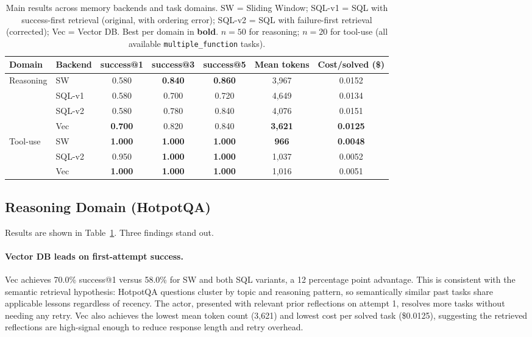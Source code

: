 \documentclass{article}
\begin{document}
\begin{table}[t]
\centering
\caption{
  Main results across memory backends and task domains.
  SW = Sliding Window; SQL-v1 = SQL with success-first retrieval (original,
  with ordering error); SQL-v2 = SQL with failure-first retrieval
  (corrected); Vec = Vector DB. Best per domain in \textbf{bold}.
  $n{=}50$ for reasoning; $n{=}20$ for tool-use (all available
  \texttt{multiple\_function} tasks).
}
\label{tab:main}
\small
\begin{tabular}{llccccc}
\toprule
Domain & Backend & success@1 & success@3 & success@5
  & Mean tokens & Cost/solved (\$) \\
\midrule
\multirow{4}{*}{Reasoning}
  & SW       & 0.580 & \textbf{0.840} & \textbf{0.860}
             & 3{,}967 & 0.0152 \\
  & SQL-v1   & 0.580 & 0.700          & 0.720
             & 4{,}649 & 0.0134 \\
  & SQL-v2   & 0.580 & 0.780          & 0.840
             & 4{,}076 & 0.0151 \\
  & Vec      & \textbf{0.700} & 0.820 & 0.840
             & \textbf{3{,}621} & \textbf{0.0125} \\
\midrule
\multirow{3}{*}{Tool-use}
  & SW       & \textbf{1.000} & \textbf{1.000} & \textbf{1.000}
             & \textbf{966} & \textbf{0.0048} \\
  & SQL-v2   & 0.950          & \textbf{1.000} & \textbf{1.000}
             & 1{,}037 & 0.0052 \\
  & Vec      & \textbf{1.000} & \textbf{1.000} & \textbf{1.000}
             & 1{,}016 & 0.0051 \\
\bottomrule
\end{tabular}
\end{table}

\subsection{Reasoning Domain (HotpotQA)}

Results are shown in Table~\ref{tab:main}. Three findings stand out.

\paragraph{Vector DB leads on first-attempt success.}
Vec achieves 70.0\% success@1 versus 58.0\% for SW and both SQL variants,
a 12 percentage point advantage. This is consistent with the semantic
retrieval hypothesis: HotpotQA questions cluster by topic and reasoning
pattern, so semantically similar past tasks share applicable lessons
regardless of recency. The actor, presented with relevant prior reflections
on attempt 1, resolves more tasks without needing any retry. Vec also
achieves the lowest mean token count (3{,}621) and lowest cost per solved
task (\$0.0125), suggesting the retrieved reflections are high-signal
enough to reduce response length and retry overhead.
\end{document}
